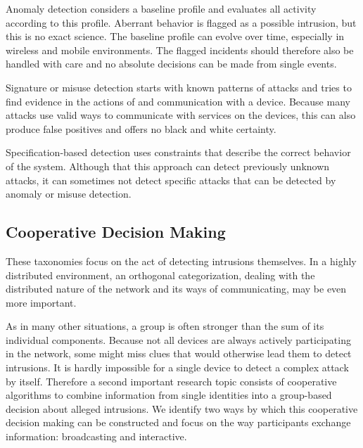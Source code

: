 \documentclass[conference]{IEEEtran}
\begin{document}
\begin{LaTeXdescription}
  
  \item[Anomaly detection] considers a baseline profile and evaluates all
  activity according to this profile. Aberrant behavior is flagged as a
  possible intrusion, but this is no exact science. The baseline profile can
  evolve over time, especially in wireless and mobile environments. The flagged
  incidents should therefore also be handled with care and no absolute
  decisions can be made from single events.
  
  \item[Signature or misuse detection] starts with known patterns of attacks
  and tries to find evidence in the actions of and communication with a device.
  Because many attacks use valid ways to communicate with services on the
  devices, this can also produce false positives and offers no black and white
  certainty.
  
  \item[Specification-based detection] uses constraints that describe the
  correct behavior of the system. Although that this approach can detect
  previously unknown attacks, it can sometimes not detect specific attacks that
  can be detected by anomaly or misuse detection.
  
\end{LaTeXdescription}

\subsection*{Cooperative Decision Making}
\label{coorperative}

These taxonomies focus on the act of detecting intrusions themselves. In a
highly distributed environment, an orthogonal categorization, dealing with the
distributed nature of the network and its ways of communicating, may be even
more important.

As in many other situations, a group is often stronger than the sum of its
individual components. Because not all devices are always actively
participating in the network, some might miss clues that would otherwise lead
them to detect intrusions. It is hardly impossible for a single device to
detect a complex attack by itself. Therefore a second important research topic
consists of cooperative algorithms to combine information from single
identities into a group-based decision about alleged intrusions. We identify
two ways by which this cooperative decision making can be constructed and focus
on the way participants exchange information: broadcasting and interactive.
\end{document}
